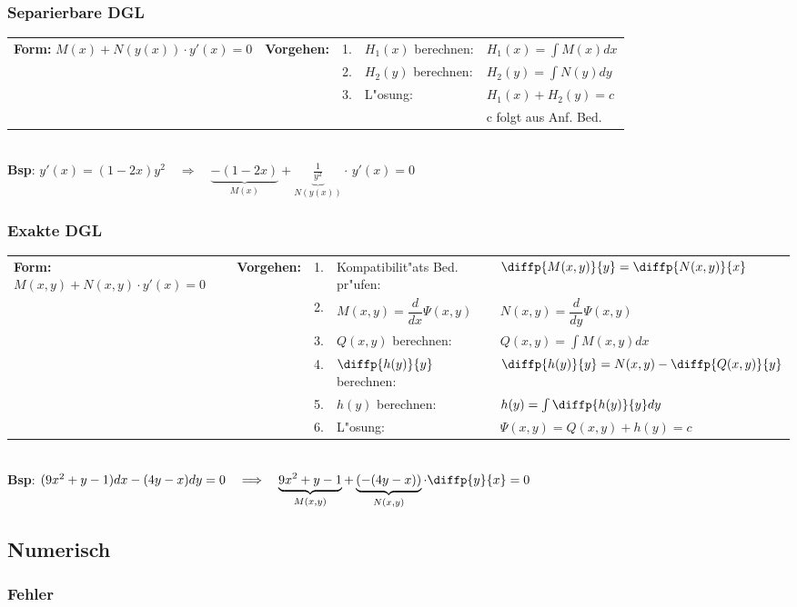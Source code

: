 \subsubsection{Separierbare DGL}
\begin{tabular}{p{6cm}p{2cm}p{0.2cm}p{3.8cm}p{6.5cm}}
\textbf{Form:} \quad $M(x) + N(y(x))\cdot y'(x) = 0$ &
\textbf{Vorgehen:} &
1.& $H_1(x)$ berechnen: & $H_1(x) = \int M(x) dx$ \\ &&
2.& $H_2(y)$ berechnen: & $H_2(y) = \int N(y)dy$ \\ &&
3.& L"osung: & $H_1(x) + H_2(y) = c$ \\ & & & & c folgt aus Anf. Bed.\\
\end{tabular} \\
\textbf{Bsp}: $y'(x) = (1-2x)y^2 \quad \Longrightarrow \quad \underbrace{-(1-2x)}_{M(x)} + \underbrace{\frac{1}{y^2}}_{N(y(x))} \cdot\, y'(x) = 0$

\subsubsection{Exakte DGL}
\begin{tabular}{p{6cm}p{2cm}p{0.2cm}p{3.8cm}p{6.5cm}}
\textbf{Form:} \quad $M(x,y) + N(x,y)\cdot y'(x) = 0$ &
\textbf{Vorgehen:} &
1. & Kompatibilit"ats Bed. pr"ufen: & $\diffp{M(x,y)}{y} = \diffp{N(x,y)}{x}$ \\ &&
2. & $ M(x,y) = \dfrac{d}{dx}\Psi(x,y)$ & $N(x,y) = \dfrac{d}{dy}\Psi(x,y) $ \\ &&
3. & $Q(x,y)$ berechnen: & $Q(x,y) = \int M(x,y) dx$ \\ &&
4. & $\diffp{h(y)}{y}$ berechnen: & $\diffp{h(y)}{y} = N(x,y) - \diffp{Q(x,y)}{y}$ \\ &&
5. & $h(y)$ berechnen: & $h(y) = \int \diffp{h(y)}{y} dy $ \\ &&
6. & L"osung: & $\Psi(x,y) = Q(x,y) + h(y) = c $ \\
\end{tabular} \\
\textbf{Bsp}: $(9x^2 + y -1)dx - (4y -x)dy = 0 \quad \Longrightarrow \quad  \underbrace{9x^2 +y -1}_{M(x,y)} + \underbrace{(-(4y -x))}_{N(x,y)} \cdot \diffp{y}{x} = 0$

\subsection{Numerisch}
\subsubsection{Fehler}

